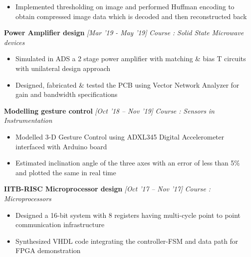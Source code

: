 \documentclass[10 pt]{article}%
\begin{document}
{{\begin{itemize}[leftmargin=*]
\item Implemented thresholding on image and performed Huffman encoding to obtain compressed image data which is decoded and then reconstructed back
	\end{itemize}
{\flushleft \textbf {\large{Power Amplifier design}} \hfill {{{\em{[Mar '19 - May '19]}}}}
	\vspace{-0.8em}
	{\flushleft \em{Course : Solid State Microwave devices}}
	\vspace{-5pt}
	\begin{itemize}[leftmargin=*]
		\setlength\itemsep{1.5pt}
		\setlength\parskip{1.5pt}
		\item Simulated in ADS a 2 stage power amplifier with matching \& bias T circuits with unilateral design approach
		\item Designed, fabricated \& testsd the PCB using Vector Network Analyzer for gain and bandwidth specifications
	\end{itemize}
{\flushleft \textbf {\large{Modelling gesture control}} \hfill {{{\em{[Oct '18 – Nov '19]}}}}
	\vspace{-0.8em}
	{\flushleft \em{Course : Sensors in Instrumentation}}
	\vspace{-5pt}
	\begin{itemize}[leftmargin=*]
		\setlength\itemsep{1.5pt}
\setlength\parskip{1.5pt}
		\item Modelled 3-D Gesture Control using ADXL345 Digital Accelerometer interfaced with Arduino board
		\item Estimated inclination angle of the three axes with an error of less than 5\% and plotted the same in real time
	\end{itemize}
{\flushleft \textbf {\large{IITB-RISC Microprocessor design}} \hfill {{{\em{[Oct '17 – Nov '17]}}}}
	\vspace{-0.8em}
	{\flushleft \em{Course : Microprocessors}}
	\vspace{-5pt}
	\begin{itemize}[leftmargin=*]
		\setlength\itemsep{1.5pt}
\setlength\parskip{1.5pt}
		\item Designed a 16-bit system with 8 registers having multi-cycle point to point communication infrastructure
		\item Synthesized VHDL code integrating the controller-FSM and data path for FPGA demonstration

\end{itemize}}}}}}
\end{document}
